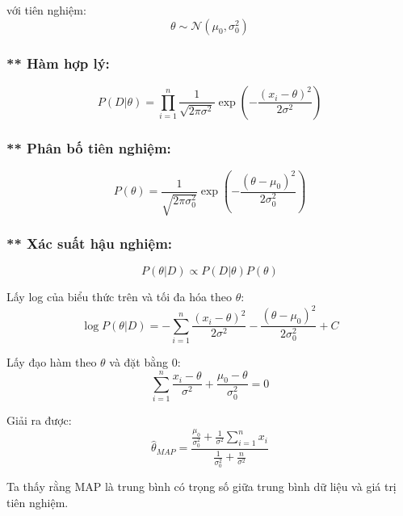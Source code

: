 với tiên nghiệm:
\begin{equation*}
    \theta \sim \mathcal{N}(\mu_0, \sigma_0^2)
\end{equation*}

\subsubsection*{** Hàm hợp lý:}
\begin{equation*}
    P(D|\theta) = \prod_{i=1}^{n} \frac{1}{\sqrt{2\pi\sigma^2}} \exp \left( -\frac{(x_i - \theta)^2}{2\sigma^2} \right)
\end{equation*}

\subsubsection*{** Phân bố tiên nghiệm:}
\begin{equation*}
    P(\theta) = \frac{1}{\sqrt{2\pi\sigma_0^2}} \exp \left( -\frac{(\theta - \mu_0)^2}{2\sigma_0^2} \right)
\end{equation*}

\subsubsection*{** Xác suất hậu nghiệm:}
\begin{equation*}
    P(\theta | D) \propto P(D|\theta) P(\theta)
\end{equation*}

Lấy log của biểu thức trên và tối đa hóa theo $\theta$:
\begin{equation*}
    \log P(\theta | D) = -\sum_{i=1}^{n} \frac{(x_i - \theta)^2}{2\sigma^2} - \frac{(\theta - \mu_0)^2}{2\sigma_0^2} + C
\end{equation*}

Lấy đạo hàm theo $\theta$ và đặt bằng 0:
\begin{equation*}
    \sum_{i=1}^{n} \frac{x_i - \theta}{\sigma^2} + \frac{\mu_0 - \theta}{\sigma_0^2} = 0
\end{equation*}

Giải ra được:
\begin{equation*}
    \hat{\theta}_{MAP} = \frac{\frac{\mu_0}{\sigma_0^2} + \frac{1}{\sigma^2} \sum_{i=1}^{n} x_i}{\frac{1}{\sigma_0^2} + \frac{n}{\sigma^2}}
\end{equation*}

Ta thấy rằng MAP là trung bình có trọng số giữa trung bình dữ liệu và giá trị tiên nghiệm.

